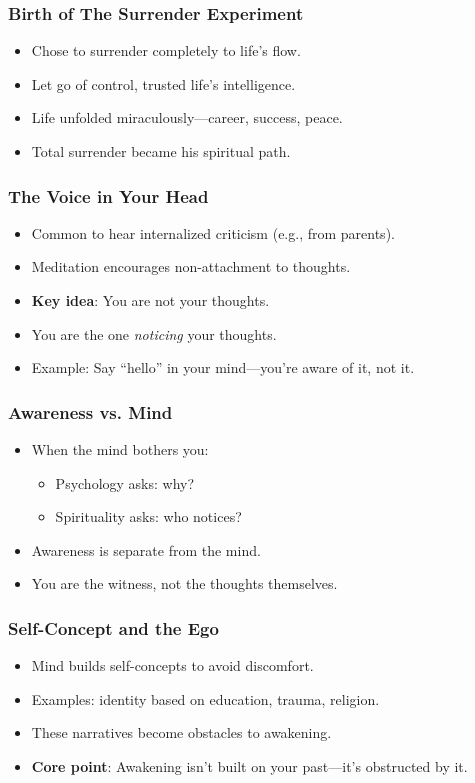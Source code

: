 \begin{frame}[fragile]\frametitle{Birth of The Surrender Experiment}
    \begin{itemize}
        \item Chose to surrender completely to life’s flow.
        \item Let go of control, trusted life’s intelligence.
        \item Life unfolded miraculously—career, success, peace.
        \item Total surrender became his spiritual path.
    \end{itemize}
\end{frame}


\begin{frame}[fragile]\frametitle{The Voice in Your Head}
  \begin{itemize}
    \item Common to hear internalized criticism (e.g., from parents).
    \item Meditation encourages non-attachment to thoughts.
    \item \textbf{Key idea}: You are not your thoughts.
    \item You are the one \textit{noticing} your thoughts.
    \item Example: Say “hello” in your mind---you’re aware of it, not it.
  \end{itemize}
\end{frame}

\begin{frame}[fragile]\frametitle{Awareness vs. Mind}
  \begin{itemize}
    \item When the mind bothers you:
    \begin{itemize}
      \item Psychology asks: why?
      \item Spirituality asks: who notices?
    \end{itemize}
    \item Awareness is separate from the mind.
    \item You are the witness, not the thoughts themselves.
  \end{itemize}
\end{frame}

\begin{frame}[fragile]\frametitle{Self-Concept and the Ego}
  \begin{itemize}
    \item Mind builds self-concepts to avoid discomfort.
    \item Examples: identity based on education, trauma, religion.
    \item These narratives become obstacles to awakening.
    \item \textbf{Core point}: Awakening isn't built on your past---it’s obstructed by it.
  \end{itemize}
\end{frame}


